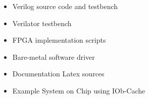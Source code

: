 %

\begin{itemize}                                            
  \itemsep-0.5em
\item Verilog source code and testbench
\item Verilator testbench
\item FPGA implementation scripts
\item Bare-metal software driver                                                   
\item Documentation Latex sources
\item Example System on Chip using IOb-Cache
\end{itemize}   
